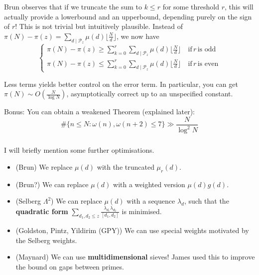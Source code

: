 \begin{frame}\frametitle{\insertsubsection}
Brun observes that if we truncate the sum to \(k \leq r\) for some threshold \(r\), this will actually provide a lowerbound and an upperbound, depending purely on the sign of \(r\)! This is not trivial but intuitively plausible. Instead of \(\pi(N) - \pi(z) = \sum_{d \mid \mathscr{P}_z} \mu(d)\lfloor\frac{N}{d}\rfloor\), we now have
\[
\begin{cases*}
  \pi(N) - \pi(z) \geq \sum_{k = 0}^r \sum_{d \mid \mathscr{P}_z} \mu(d)\lfloor\frac{N}{d}\rfloor \quad\text{if} \, r \, \text{is odd} \\
  \pi(N) - \pi(z) \leq \sum_{k = 0}^r \sum_{d \mid \mathscr{P}_z} \mu(d)\lfloor\frac{N}{d}\rfloor \quad\text{if} \, r \, \text{is even}
\end{cases*}
\]

Less terms yields better control on the error term. In particular, you can get \(\pi(N) \sim O\left(\frac{N}{\log N}\right)\), asymptotically correct up to an unspecified constant.
\pause

Bonus: You can obtain a weakened Theorem (explained later):
\[
  \#\{n \leq N : \omega(n), \omega(n + 2) \leq 7\} \gg \frac{N}{\log^2 N}
\]
\end{frame}

\begin{frame}\frametitle{\insertsubsection}
I will briefly mention some further optimisations.

\begin{itemize}
  \item (Brun) We replace \(\mu(d)\) with the truncated \(\mu_r(d)\).
  \item (Brun?) We can replace \(\mu(d)\) with a weighted version \(\mu(d)g(d)\).
  \item (Selberg \(\Lambda^2\)) We can replace \(\mu(d)\) with a sequence \(\lambda_d\), such that the \textbf{quadratic form} \(\sum_{d_1, d_2 \leq z} \frac{\lambda_{d_1} \lambda_{d_2}}{[d_1, d_2]}\) is minimised.
  \item (Goldston, Pintz, Yildirim (GPY)) We can use special weights motivated by the Selberg weights.
  \item (Maynard) We can use \textbf{multidimensional} sieves! James used this to improve the bound on gaps between primes.
\end{itemize}
\end{frame}
